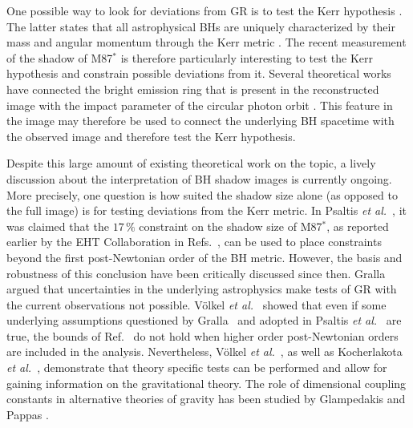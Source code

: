 \documentclass[%
nofootinbib,
 amsmath,amssymb,
 aps,
floatfix,
twocolumn
]{revtex4-2}
\begin{document}
One possible way to look for deviations from GR is to test the Kerr hypothesis \cite{Robinson:1975bv,Israel:1967wq,Hawking:1971vc}. The latter states that all astrophysical BHs are uniquely characterized by their mass and angular momentum through the Kerr metric \cite{Kerr:1963ud}. The recent measurement of the shadow of M87$^*$ is therefore particularly interesting to test the Kerr hypothesis and constrain possible deviations from it. Several theoretical works have connected the bright emission ring that is present in the reconstructed image with the impact parameter of the circular photon orbit \cite{Takahashi:2005hy,Johannsen:2010ru,Psaltis:2010ca,Amarilla:2011fx,Loeb:2013lfa,Psaltis:2014mca,Johannsen:2015hib,Psaltis:2015uza,Cunha:2015yba,Cunha:2016wzk,Psaltis:2018xkc,Cunha:2019dwb,Medeiros:2019cde,Younsi:2016azx}. This feature in the image may therefore be used to connect the underlying BH spacetime with the observed image and therefore test the Kerr hypothesis.

Despite this large amount of existing theoretical work on the topic, a lively discussion about the interpretation of BH shadow images is currently ongoing. More precisely, one question is how suited the shadow size alone (as opposed to the full image) is for testing deviations from the Kerr metric. In Psaltis \textit{et al.}~\cite{PhysRevLett.125.141104}, it was claimed that the $17\,\%$ constraint on the shadow size of M87$^{*}$, as reported earlier by the EHT Collaboration in Refs.~\cite{eht,Akiyama:2019eap}, can be used to place constraints beyond the first post-Newtonian order of the BH metric. However, the basis and robustness of this conclusion have been critically discussed since then. Gralla~\cite{Gralla:2020pra} argued that uncertainties in the underlying astrophysics make tests of GR with the current observations not possible. V\"olkel \textit{et al.}~\cite{Volkel:2020xlc} showed that even if some underlying assumptions questioned by Gralla~\cite{Gralla:2020pra} and adopted in Psaltis \textit{et al.}~\cite{PhysRevLett.125.141104} are true, the bounds of Ref.~\cite{PhysRevLett.125.141104} do not hold when higher order post-Newtonian orders are included in the analysis. Nevertheless, V\"olkel \textit{et al.}~\cite{Volkel:2020xlc}, as well as 
Kocherlakota \textit{et al.}~\cite{Kocherlakota:2021dcv}, demonstrate that theory specific tests can be performed and allow for gaining information on the gravitational theory. The role of dimensional coupling constants in alternative theories of gravity has been studied by Glampedakis and Pappas \cite{Glampedakis:2021oie}. 
\end{document}
